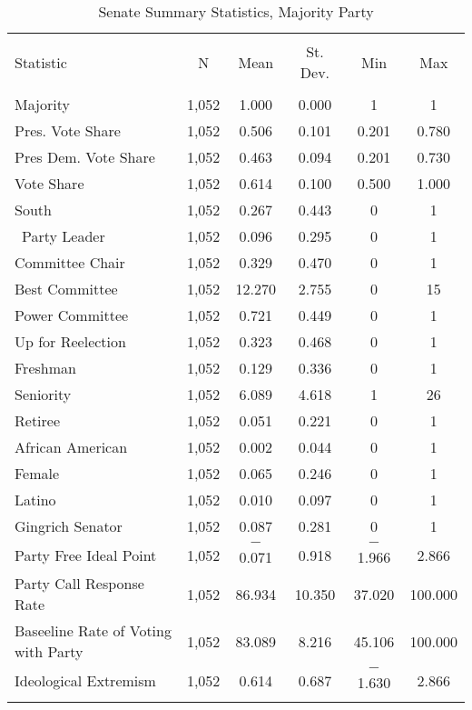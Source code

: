\documentclass[12pt]{article}
\begin{document}
\begin{table}[!htbp] \centering 
	\caption{Senate Summary Statistics, Majority Party} 
	\label{} 
	\begin{tabular}{@{\extracolsep{5pt}}lccccc} 
		\\[-1.8ex]\hline 
		\hline \\[-1.8ex] 
		Statistic & \multicolumn{1}{c}{N} & \multicolumn{1}{c}{Mean} & \multicolumn{1}{c}{St. Dev.} & \multicolumn{1}{c}{Min} & \multicolumn{1}{c}{Max} \\ 
		\hline \\[-1.8ex] 
		Majority & 1,052 & 1.000 & 0.000 & 1 & 1 \\ 
		Pres. Vote Share & 1,052 & 0.506 & 0.101 & 0.201 & 0.780 \\ 
		Pres Dem. Vote Share & 1,052 & 0.463 & 0.094 & 0.201 & 0.730 \\ 
		Vote Share & 1,052 & 0.614 & 0.100 & 0.500 & 1.000 \\ 
		South & 1,052 & 0.267 & 0.443 & 0 & 1 \\ \
		Party Leader & 1,052 & 0.096 & 0.295 & 0 & 1 \\ 
		Committee Chair & 1,052 & 0.329 & 0.470 & 0 & 1 \\ 
		Best Committee & 1,052 & 12.270 & 2.755 & 0 & 15 \\ 
		Power Committee & 1,052 & 0.721 & 0.449 & 0 & 1 \\ 
		Up for Reelection & 1,052 & 0.323 & 0.468 & 0 & 1 \\ 
		Freshman & 1,052 & 0.129 & 0.336 & 0 & 1 \\ 
		Seniority & 1,052 & 6.089 & 4.618 & 1 & 26 \\ 
		Retiree & 1,052 & 0.051 & 0.221 & 0 & 1 \\  
		African American & 1,052 & 0.002 & 0.044 & 0 & 1 \\ 
		Female & 1,052 & 0.065 & 0.246 & 0 & 1 \\ 
		Latino & 1,052 & 0.010 & 0.097 & 0 & 1 \\ 
		Gingrich Senator & 1,052 & 0.087 & 0.281 & 0 & 1 \\ 
		Party Free Ideal Point & 1,052 & $-$0.071 & 0.918 & $-$1.966 & 2.866 \\ 
		Party Call Response Rate & 1,052 & 86.934 & 10.350 & 37.020 & 100.000 \\ 
		Baseeline Rate of Voting with Party & 1,052 & 83.089 & 8.216 & 45.106 & 100.000 \\ 
		Ideological Extremism & 1,052 & 0.614 & 0.687 & $-$1.630 & 2.866 \\ 
		\hline \\[-1.8ex] 
	\end{tabular} 
\end{table} 
\end{document}

